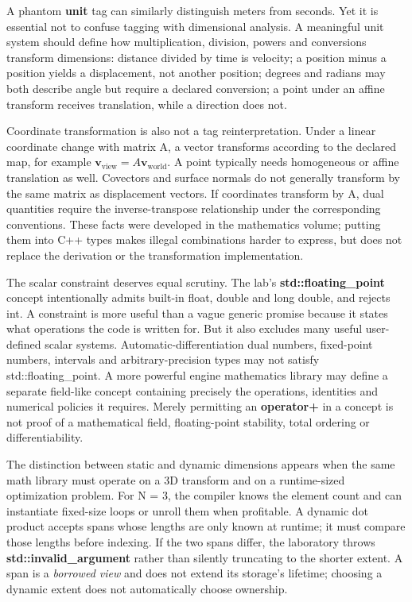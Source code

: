 A phantom \textbf{unit} tag can similarly distinguish meters from seconds. Yet it is essential not to confuse tagging with dimensional analysis. A meaningful unit system should define how multiplication, division, powers and conversions transform dimensions: distance divided by time is velocity; a position minus a position yields a displacement, not another position; degrees and radians may both describe angle but require a declared conversion; a point under an affine transform receives translation, while a direction does not.

Coordinate transformation is also not a tag reinterpretation. Under a linear coordinate change with matrix A, a vector transforms according to the declared map, for example \(\mathbf{v}_{\mathrm{view}}=A\mathbf{v}_{\mathrm{world}}\). A point typically needs homogeneous or affine translation as well. Covectors and surface normals do not generally transform by the same matrix as displacement vectors. If coordinates transform by A, dual quantities require the inverse-transpose relationship under the corresponding conventions. These facts were developed in the mathematics volume; putting them into C++ types makes illegal combinations harder to express, but does not replace the derivation or the transformation implementation.

The scalar constraint deserves equal scrutiny. The lab's \textbf{std::floating\_point} concept intentionally admits built-in float, double and long double, and rejects int. A constraint is more useful than a vague generic promise because it states what operations the code is written for. But it also excludes many useful user-defined scalar systems. Automatic-differentiation dual numbers, fixed-point numbers, intervals and arbitrary-precision types may not satisfy std::floating\_point. A more powerful engine mathematics library may define a separate field-like concept containing precisely the operations, identities and numerical policies it requires. Merely permitting an \textbf{operator+} in a concept is not proof of a mathematical field, floating-point stability, total ordering or differentiability.

The distinction between static and dynamic dimensions appears when the same math library must operate on a 3D transform and on a runtime-sized optimization problem. For N = 3, the compiler knows the element count and can instantiate fixed-size loops or unroll them when profitable. A dynamic dot product accepts spans whose lengths are only known at runtime; it must compare those lengths before indexing. If the two spans differ, the laboratory throws \textbf{std::invalid\_argument} rather than silently truncating to the shorter extent. A span is a \emph{borrowed view} and does not extend its storage's lifetime; choosing a dynamic extent does not automatically choose ownership.

